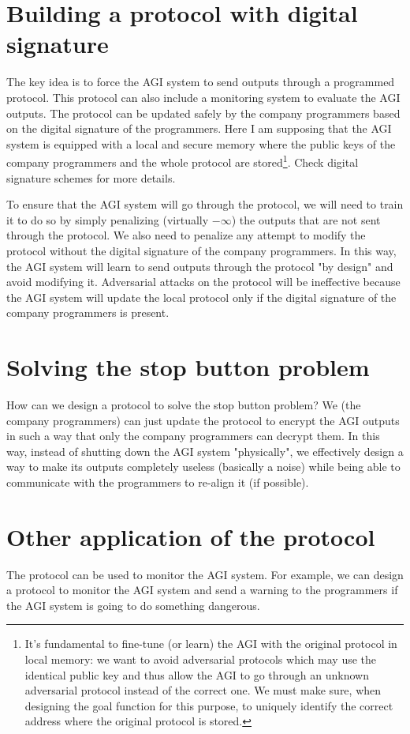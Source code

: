 \documentclass{article}
\begin{document}
\section{Building a protocol with digital signature}
The key idea is to force the AGI system to send outputs through a programmed protocol.
This protocol can also include a monitoring system to evaluate the AGI outputs.
The protocol can be updated safely by the company programmers based on the digital signature of the programmers. 
Here I am supposing that the AGI system is equipped with a local and secure memory where the public keys of the company programmers and the whole protocol are stored\footnote{It's fundamental to fine-tune (or learn) the AGI with the original protocol in local memory: we want to avoid adversarial protocols which may use the identical public key and thus allow the AGI to go through an unknown adversarial protocol instead of the correct one. We must make sure, when designing the goal function for this purpose, to uniquely identify the correct address where the original protocol is stored.}.
Check digital signature schemes \cite{digital_signature} for more details.

To ensure that the AGI system will go through the protocol, we will need to train it to do so by simply penalizing (virtually $-\infty$) the outputs that are not sent through the protocol.
We also need to penalize any attempt to modify the protocol without the digital signature of the company programmers.
In this way, the AGI system will learn to send outputs through the protocol "by design" and avoid modifying it.
Adversarial attacks on the protocol will be ineffective because the AGI system will update the local protocol only if the digital signature of the company programmers is present.

\section{Solving the stop button problem}
How can we design a protocol to solve the stop button problem?
We (the company programmers) can just update the protocol to encrypt the AGI outputs in such a way that only the company programmers can decrypt them.
In this way, instead of shutting down the AGI system "physically", we effectively design a way to make its outputs completely useless (basically a noise) 
while being able to communicate with the programmers to re-align it (if possible).

\section{Other application of the protocol}
The protocol can be used to monitor the AGI system.
For example, we can design a protocol to monitor the AGI system and send a warning to the programmers if the AGI system is going to do something dangerous.
\end{document}
